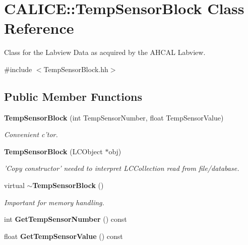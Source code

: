 \section{CALICE::TempSensorBlock Class Reference}
\label{classCALICE_1_1TempSensorBlock}


Class for the Labview Data as acquired by the AHCAL Labview.  


{\ttfamily \#include $<$TempSensorBlock.hh$>$}\subsection*{Public Member Functions}
\begin{DoxyCompactItemize}
\item 
{\bf TempSensorBlock} (int TempSensorNumber, float TempSensorValue)\label{classCALICE_1_1TempSensorBlock_a5577684f2bdde7b3a3f201638f0aaf7a}

\begin{DoxyCompactList}\small\item\em Convenient c'tor. \item\end{DoxyCompactList}\item 
{\bf TempSensorBlock} (LCObject $\ast$obj)\label{classCALICE_1_1TempSensorBlock_ae45af5d892fd90492c15584eb1694190}

\begin{DoxyCompactList}\small\item\em 'Copy constructor' needed to interpret LCCollection read from file/database. \item\end{DoxyCompactList}\item 
virtual {\bf $\sim$TempSensorBlock} ()\label{classCALICE_1_1TempSensorBlock_aededba4f51f50d3056d76a31a97ec1ac}

\begin{DoxyCompactList}\small\item\em Important for memory handling. \item\end{DoxyCompactList}\item 
int {\bfseries GetTempSensorNumber} () const \label{classCALICE_1_1TempSensorBlock_af99dd00f4a3450d25eaa8b2bcb1e2b38}

\item 
float {\bfseries GetTempSensorValue} () const \label{classCALICE_1_1TempSensorBlock_a1485ee33033ab3a99c2ee8d3e5273138}


\end{DoxyCompactItemize}
